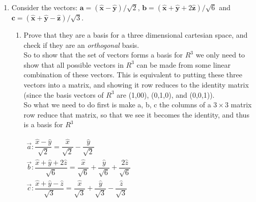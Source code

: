 \documentclass[fleqn]{article}
\begin{document}
\begin{enumerate}


  \item Consider the vectors: $\mathbf{a}=( \mathbf{\hat{x}} - \mathbf{\hat{y}} ) / \sqrt{2} $, $\mathbf{b}=( \mathbf{\hat{x}} + \mathbf{\hat{y}} + 2 \mathbf{\hat{z}} ) / \sqrt{6}$ and $\mathbf{c}=(\mathbf{\hat{x}}+\mathbf{\hat{y}}-\mathbf{\hat{z}})/\sqrt{3}$. 
  \begin{enumerate}
  \item Prove that they are a basis for a three dimensional cartesian space, and check if they are an \emph{orthogonal} basis. 
  \\
  
  So to show that the set of vectors forms a basis for $R^3$ we only need to show that all possible vectors in $R^3$ can be made from some linear combination of these vectors. This is equivalent to putting these three vectors into a matrix, and showing it row reduces to the identity matrix (since the basis vectors of $R^3$ are (1,00), (0,1,0), and (0,0,1)).
  \\
  So what we need to do first is make a, b, c the columns of a $3\times3$ matrix row reduce that matrix, so that we see it becomes the identity, and thus is a basis for $R^3$
  
  \noindent
  $
  \begin{array}{lll}
    \overrightarrow{a}: \dfrac{\hat{x}-\hat{y}}{\sqrt{2}}=\dfrac{\hat{x}}{\sqrt{2}}-\dfrac{\hat{y}}{\sqrt{2}} \\
    \overrightarrow{b}: \dfrac{\hat{x}+\hat{y}+2\hat{z}}{\sqrt{6}}=\dfrac{\hat{x}}{\sqrt{6}}+\dfrac{\hat{y}}{\sqrt{6}}+\dfrac{2\hat{z}}{\sqrt{6}} \\
    \overrightarrow{c}: \dfrac{\hat{x}+\hat{y}-\hat{z}}{\sqrt{3}}=\dfrac{\hat{x}}{\sqrt{3}}+\dfrac{\hat{y}}{\sqrt{3}}-\dfrac{\hat{z}}{\sqrt{3}}
    \end{array}  
  $
  \bigbreak
  

\end{enumerate}
\end{enumerate}
\end{document}
